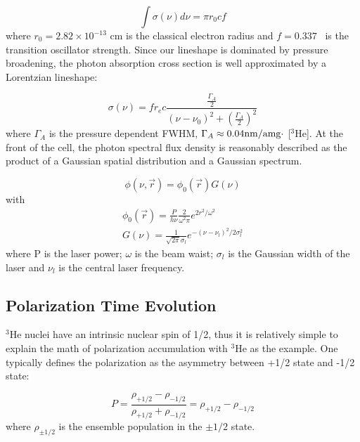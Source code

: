 \begin{equation}
\int\sigma(\nu)d\nu=\pi r_{0}cf
\end{equation}
where $r_{0}=2.82 \times 10^{-13}$ cm is the classical electron radius and $f=0.337$~\cite{PhysRevA.44.3108} is the transition oscillator strength. Since our lineshape is dominated by pressure broadening, the photon absorption cross section is well approximated by a Lorentzian lineshape:

\begin{equation}
\sigma(\nu)=fr_{e}c\frac{\frac{\Gamma_{A}}{2}}{(\nu-\nu_{0})^{2}+(\frac{\Gamma_{A}}{2})^{2}}
\end{equation}
where $\Gamma_{A}$ is the pressure dependent FWHM, $\Gamma_{A}\approx 0.04 {\rm nm/amg} \cdot$ [$^{3}$He]. At the front of the cell, the photon spectral flux density is reasonably described as the product of a Gaussian spatial distribution and a Gaussian spectrum.

\begin{equation}
\phi(\nu,\vec{r})=\phi_{0}(\vec{r})G(\nu)
\end{equation}
with 
\begin{subequations}
	\begin{gather}
	\phi_{0}(\vec{r})=\frac{P}{h\nu}\frac{2}{\omega^{2}\pi}e^{2r^{2}/\omega^{2}}\\
	G(\nu)=\frac{1}{\sqrt{2\pi}\sigma_{l}}e^{-(\nu-\nu_{l})^2/2\sigma_{l}^{2}}
	\end{gather}
\end{subequations}
where P is the laser power; $\omega$ is the beam waist;  $\sigma_{l}$ is the Gaussian width of the laser and $\nu_{l}$ is the central laser frequency.

\subsection{Polarization Time Evolution}

$^{3}$He nuclei have an intrinsic nuclear spin of 1/2, thus it is relatively simple to explain the math of polarization accumulation with $^{3}$He as the example. One typically defines the polarization as the asymmetry between +1/2 state and -1/2 state:

\begin{equation}
P=\frac{\rho_{+1/2}-\rho_{-1/2}}{\rho_{+1/2}+\rho_{-1/2}}=\rho_{+1/2}-\rho_{-1/2}
\end{equation}
where $\rho_{\pm 1/2}$ is the ensemble population in the $\pm1/2$ state.

